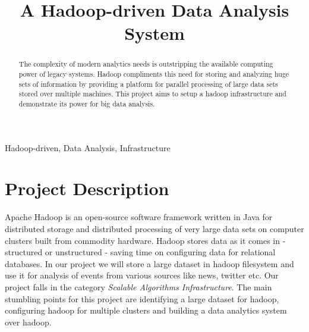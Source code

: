 \documentclass[10pt,conference]{IEEEtran}
\begin{document}
\title{A Hadoop-driven Data Analysis System}

\author{%
\and
{}
\and
{}
}

\maketitle

\begin{abstract}
\textnormal{%
The complexity of modern analytics needs is outstripping the available computing power of legacy systems. Hadoop compliments this need for storing and analyzing huge sets of information by providing a platform for parallel processing of large data sets stored over multiple machines. This project aims to setup a hadoop infrastructure and demonstrate its power for big data analysis. 
}
\end{abstract}

\begin{IEEEkeywords}
  \textnormal{Hadoop-driven, Data Analysis, Infrastructure}
\end{IEEEkeywords}

\IEEEpeerreviewmaketitle

\section{Project Description}\label{sec:project-description}

Apache Hadoop is an open-source software framework written in Java for distributed storage and distributed processing of very large data sets on computer clusters built from commodity hardware. Hadoop stores data as it comes in - structured or unstructured - saving time on configuring data for relational databases. In our project we will store a large dataset in hadoop filesystem and use it for analysis of events from various sources like news, twitter etc. Our project falls in the category \textit{Scalable Algorithms Infrastructure}. The main stumbling points for this project are identifying a large dataset for hadoop, configuring hadoop for multiple clusters and building a data analytics system over hadoop.
\end{document}
